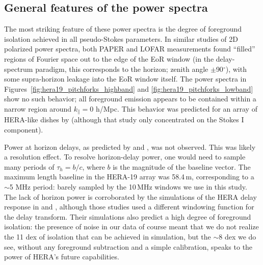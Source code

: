 \subsection{General features of the power spectra}
\label{subsec:general_features}
The most striking feature of these power spectra is the degree of foreground isolation achieved in all pseudo-Stokes parameters. In similar studies of 2D polarized power spectra, both PAPER \citep{Kohn.16} and LOFAR \citep{Asad.17} measurements found ``filled'' regions of Fourier space out to the edge of the EoR window (in the delay-spectrum paradigm, this corresponds to the horizon; zenith angle $\pm$90$^{\circ}$), with some supra-horizon leakage \citep{Pober.13} into the EoR window itself. The power spectra in Figures~\ref{fig:hera19_pitchforks_highband} and \ref{fig:hera19_pitchforks_lowband} show no such behavior; all foreground emission appears to be contained within a narrow region around $k_{\parallel}=0$ h/Mpc. This behavior was predicted for an array of HERA-like dishes by \citealt{Nithya.15b} (although that study only concentrated on the Stokes I component). 

Power at horizon delays, as predicted by \cite{Nithya.15b} and \cite{Neben.16}, was not observed. This was likely a resolution effect. To resolve horizon-delay power, one would need to sample many periods of $\tau_h=b/c$, where $b$ is the magnitude of the baseline vector. The maximum length baseline in the HERA-19 array was 58.4\,m, corresponding to a $\sim$5 MHz period: barely sampled by the 10\,MHz windows we use in this study. The lack of horizon power is corroborated by the simulations of the HERA delay response in \cite{Ewall-Wice.16.HERA_Dish} and \cite{Thyagarajan.16}, although those studies used a different windowing function for the delay transform. Their simulations also predict a high degree of foreground isolation: the presence of noise in our data of course meant that we do not realize the 11 dex of isolation that can be achieved in simulation, but the $\sim$8 dex we do see, without any foreground subtraction and a simple calibration, speaks to the power of HERA's future capabilities.

